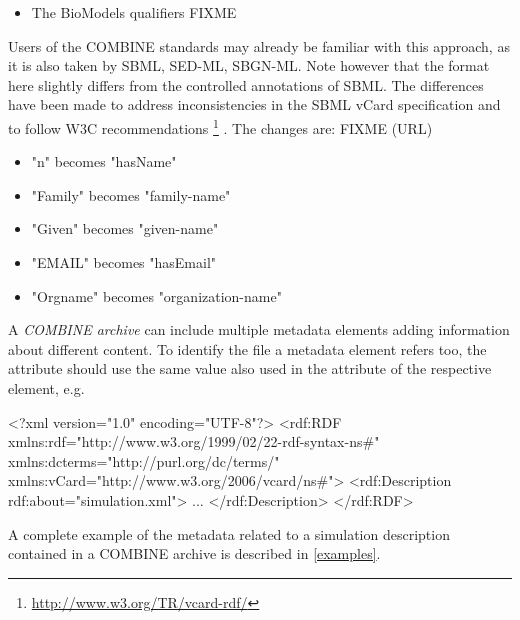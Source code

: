 \begin{itemize}
{	More information on the use of Dublin Core in RDF can be found 
	on the Dublin Core website{\footnote[3]{\url{http://dublincore.org/documents/dc-rdf/}}}. 
	
	More information is available about the definition of the date format used within  and 
	 elements{\footnote[4]{\url{http://www.w3.org/TR/NOTE-datetime}}}.
	}
\item {The BioModels qualifiers FIXME
}
\end{itemize}

Users of the COMBINE standards may already be familiar with this 
approach, as it is also taken by SBML, SED-ML, SBGN-ML. 
Note however that the format here slightly differs from the controlled 
annotations of SBML. The differences have been made to address inconsistencies 
in the SBML vCard specification and to follow W3C recommendations {\footnote[4]{\url{http://www.w3.org/TR/vcard-rdf/}}} . The changes are: FIXME (URL)

\begin{itemize}
	\item  "n" becomes "hasName" 
	\item  "Family" becomes "family-name" 
	\item  "Given" becomes "given-name" 
	\item  "EMAIL" becomes "hasEmail" 
	\item  "Orgname" becomes "organization-name" 
\end{itemize}

A \textit{COMBINE archive} can include multiple metadata elements adding information about different content. To 
identify the file a metadata element refers too, the
 attribute should use the same value also used 
in the  attribute of the respective \Content element, e.g.

\begin{example}
<?xml version="1.0" encoding="UTF-8"?>
<rdf:RDF xmlns:rdf="http://www.w3.org/1999/02/22-rdf-syntax-ns#" 
         xmlns:dcterms="http://purl.org/dc/terms/" 
				 xmlns:vCard="http://www.w3.org/2006/vcard/ns#">
   <rdf:Description rdf:about="simulation.xml">
   ...
	 </rdf:Description>
</rdf:RDF>
\end{example}

A complete example of 
the metadata related to a simulation description contained in a COMBINE 
archive is described in \ref{examples}. 


